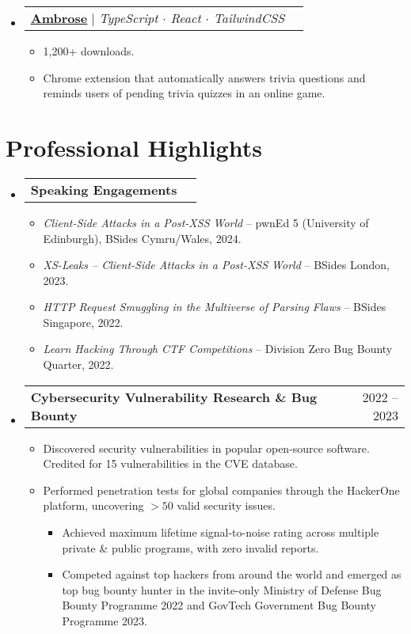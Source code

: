 \documentclass[letterpaper,10pt]{article}
\makeatletter
\newcommand{\link}[2]{\href{#1}{\color{blue}\underline{#2}}}
\newcommand{\resumeItem}[1]{
  \item\small{
    {#1 \vspace{-2pt}}
  }
}
\newcommand{\resumeProjectHeading}[2]{
  \item
  \begin{tabular*}{0.97\textwidth}{l@{\extracolsep{\fill}}r}
    \small#1 & #2 \\
  \end{tabular*}\vspace{-7pt}
}
\newenvironment{resumeSubHeadingList}{\begin{itemize}[leftmargin=0.15in, label={}]}{\end{itemize}}
\newenvironment{resumeItemList}{\begin{itemize}}{\end{itemize}}
\newenvironment{resumeItemSubList}{\begin{itemize}\setlength\itemsep{0.4em}}{\end{itemize}\vspace{-5pt}}
\makeatother
\begin{document}
\begin{resumeSubHeadingList}
  \resumeProjectHeading{
    \link{https://github.com/zeyu2001/Ambrose}{\textbf{Ambrose}} $|$
    \emph{TypeScript $\cdot$ React $\cdot$ TailwindCSS}}{}
  \begin{resumeItemList}
    \resumeItem{1,200+ downloads.}
    \resumeItem{Chrome extension that automatically answers trivia questions
                and reminds users of pending trivia quizzes in an online game.}
  \end{resumeItemList}

\end{resumeSubHeadingList}

\section{Professional Highlights}
\begin{resumeSubHeadingList}

  \resumeProjectHeading{\textbf{Speaking Engagements}}{}
  \begin{resumeItemList}
    \resumeItem{\emph{Client-Side Attacks in a Post-XSS World} -- pwnEd 5
                      (University of Edinburgh), BSides Cymru/Wales, 2024.}
    \resumeItem{\emph{XS-Leaks -- Client-Side Attacks in a Post-XSS World} --
                      BSides London, 2023.}
    \resumeItem{\emph{HTTP Request Smuggling in the Multiverse of Parsing
                      Flaws} -- BSides Singapore, 2022.}
    \resumeItem{\emph{Learn Hacking Through CTF Competitions} -- Division Zero
                      Bug Bounty Quarter, 2022.}
  \end{resumeItemList}

  \resumeProjectHeading{\textbf{Cybersecurity Vulnerability Research \& Bug Bounty}}{2022 -- 2023}
  \begin{resumeItemList}
    \resumeItem{Discovered security vulnerabilities in popular open-source
                software. Credited for 15 vulnerabilities in the CVE database.}
    \resumeItem{Performed penetration tests for global companies through the
                HackerOne platform, uncovering $>50$ valid security issues.}
      \begin{resumeItemSubList}
        \resumeItem{Achieved maximum lifetime signal-to-noise rating across
                    multiple private \& public programs, with zero invalid
                    reports.}
        \resumeItem{Competed against top hackers from around the world and
                    emerged as top bug bounty hunter in the invite-only
                    Ministry of Defense Bug Bounty Programme 2022 and GovTech
                    Government Bug Bounty Programme 2023.}
      \end{resumeItemSubList}
  \end{resumeItemList}


\end{resumeSubHeadingList}
\end{document}
